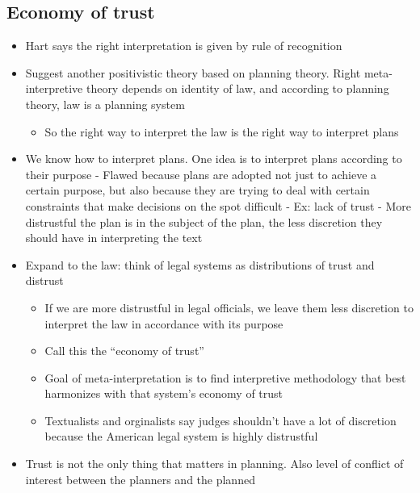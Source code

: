 \hypertarget{economy-of-trust}{%
\subsection{Economy of trust}\label{economy-of-trust}}

\begin{itemize}
\tightlist
\item
  Hart says the right interpretation is given by rule of recognition
\item
  Suggest another positivistic theory based on planning theory. Right
  meta-interpretive theory depends on identity of law, and according to
  planning theory, law is a planning system

  \begin{itemize}
  \tightlist
  \item
    So the right way to interpret the law is the right way to interpret
    plans
  \end{itemize}
\item
  We know how to interpret plans. One idea is to interpret plans
  according to their purpose - Flawed because plans are adopted not just
  to achieve a certain purpose, but also because they are trying to deal
  with certain constraints that make decisions on the spot difficult -
  Ex: lack of trust - More distrustful the plan is in the subject of the
  plan, the less discretion they should have in interpreting the text
\item
  Expand to the law: think of legal systems as distributions of trust
  and distrust

  \begin{itemize}
  \tightlist
  \item
    If we are more distrustful in legal officials, we leave them less
    discretion to interpret the law in accordance with its purpose
  \item
    Call this the ``economy of trust''
  \item
    Goal of meta-interpretation is to find interpretive methodology that
    best harmonizes with that system's economy of trust
  \item
    Textualists and orginalists say judges shouldn't have a lot of
    discretion because the American legal system is highly distrustful
  \end{itemize}
\item
  Trust is not the only thing that matters in planning. Also level of
  conflict of interest between the planners and the planned


\end{itemize}
